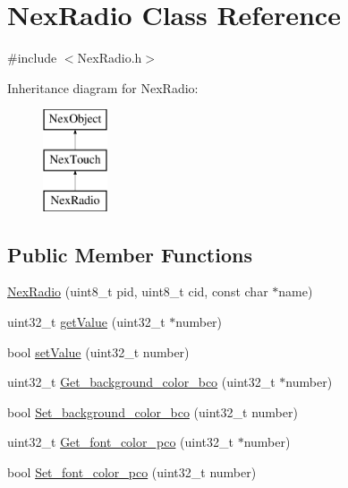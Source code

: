 \hypertarget{class_nex_radio}{\section{Nex\+Radio Class Reference}
\label{class_nex_radio}
}


{\ttfamily \#include $<$Nex\+Radio.\+h$>$}

Inheritance diagram for Nex\+Radio\+:\begin{figure}[H]
\begin{center}
\leavevmode
\includegraphics[height=3.000000cm]{class_nex_radio}
\end{center}
\end{figure}
\subsection*{Public Member Functions}
\begin{DoxyCompactItemize}
\item 
\hyperlink{class_nex_radio_a52264cd95aaa3ba7b4b07bdf64bb7a65}{Nex\+Radio} (uint8\+\_\+t pid, uint8\+\_\+t cid, const char $\ast$name)
\item 
uint32\+\_\+t \hyperlink{class_nex_radio_adb3672f10ce98ec7ad22f7b29a9ec0e6}{get\+Value} (uint32\+\_\+t $\ast$number)
\item 
bool \hyperlink{class_nex_radio_aa92d6f41ff30467a965e8a802e7d8b83}{set\+Value} (uint32\+\_\+t number)
\item 
uint32\+\_\+t \hyperlink{class_nex_radio_abdc8f654237d900eb3ddc955bc9e0038}{Get\+\_\+background\+\_\+color\+\_\+bco} (uint32\+\_\+t $\ast$number)
\item 
bool \hyperlink{class_nex_radio_a7bbd252dc78876d0831badbe791dbbc8}{Set\+\_\+background\+\_\+color\+\_\+bco} (uint32\+\_\+t number)
\item 
uint32\+\_\+t \hyperlink{class_nex_radio_a7a052fb745dfea5fe6f341692eb0ca1a}{Get\+\_\+font\+\_\+color\+\_\+pco} (uint32\+\_\+t $\ast$number)
\item 
bool \hyperlink{class_nex_radio_afd379837becbcf4a8f126820658a7f78}{Set\+\_\+font\+\_\+color\+\_\+pco} (uint32\+\_\+t number)
\end{DoxyCompactItemize}

